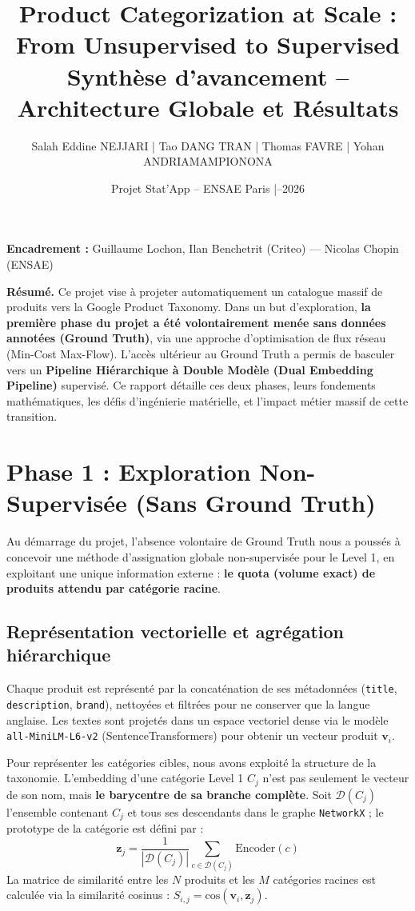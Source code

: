 \documentclass[11pt,a4paper]{article}
\title{\vspace{-1cm}\textbf{Product Categorization at Scale : From Unsupervised to Supervised}\\
\large Synthèse d’avancement -- Architecture Globale et Résultats}
\author{\small Salah Eddine NEJJARI \;|\; Tao DANG TRAN \;|\; Thomas FAVRE \;|\; Yohan ANDRIAMAMPIONONA}
\date{\small Projet Stat'App -- ENSAE Paris \;|\; 2025--2026}
\begin{document}
\maketitle
\vspace{-0.7cm}

\small
\textbf{Encadrement :} Guillaume Lochon, Ilan Benchetrit (Criteo) \;---\; Nicolas Chopin (ENSAE)

\textbf{Résumé.} Ce projet vise à projeter automatiquement un catalogue massif de produits vers la Google Product Taxonomy. Dans un but d'exploration, \textbf{la première phase du projet a été volontairement menée sans données annotées (Ground Truth)}, via une approche d'optimisation de flux réseau (Min-Cost Max-Flow). L'accès ultérieur au Ground Truth a permis de basculer vers un \textbf{Pipeline Hiérarchique à Double Modèle (Dual Embedding Pipeline)} supervisé. Ce rapport détaille ces deux phases, leurs fondements mathématiques, les défis d'ingénierie matérielle, et l'impact métier massif de cette transition.

\section{Phase 1 : Exploration Non-Supervisée (Sans Ground Truth)}

Au démarrage du projet, l'absence volontaire de Ground Truth nous a poussés à concevoir une méthode d'assignation globale non-supervisée pour le Level 1, en exploitant une unique information externe : \textbf{le quota (volume exact) de produits attendu par catégorie racine}.

\subsection{Représentation vectorielle et agrégation hiérarchique}
Chaque produit est représenté par la concaténation de ses métadonnées (\texttt{title}, \texttt{description}, \texttt{brand}), nettoyées et filtrées pour ne conserver que la langue anglaise. Les textes sont projetés dans un espace vectoriel dense via le modèle \texttt{all-MiniLM-L6-v2} (SentenceTransformers) pour obtenir un vecteur produit $\mathbf{v}_i$.

Pour représenter les catégories cibles, nous avons exploité la structure de la taxonomie. L'embedding d'une catégorie Level 1 $C_j$ n'est pas seulement le vecteur de son nom, mais \textbf{le barycentre de sa branche complète}. Soit $\mathcal{D}(C_j)$ l'ensemble contenant $C_j$ et tous ses descendants dans le graphe \texttt{NetworkX} ; le prototype de la catégorie est défini par :
\[
\mathbf{z}_j = \frac{1}{|\mathcal{D}(C_j)|} \sum_{c \in \mathcal{D}(C_j)} \text{Encoder}(c)
\]
La matrice de similarité entre les $N$ produits et les $M$ catégories racines est calculée via la similarité cosinus : $S_{i,j} = \text{cos}(\mathbf{v}_i, \mathbf{z}_j)$.
\end{document}
